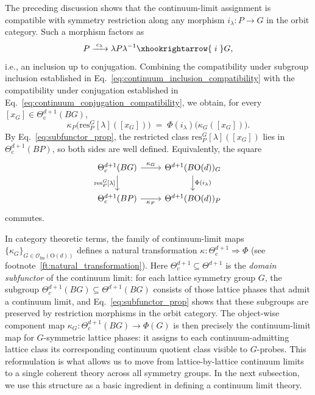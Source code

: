 \documentclass[aps,prx,reprint,superscriptaddress,twocolumn,amsmath,amssymb,amsfonts, nofootinbib]{revtex4-2}
\newcommand{\ofin}{\mathcal{O}_{\text{fin}}}
\newcommand{\res}{\text{res}}
\theoremstyle{apsstyle}
\begin{document}
The preceding discussion shows that the continuum-limit assignment is compatible with symmetry restriction along any morphism $i_\lambda:P\to G$ in the orbit category.
Such a morphism factors as \begin{equation*} P \xrightarrow{\;c_\lambda\;} \lambda P\lambda^{-1} \xhookrightarrow{\;i\;} G,\end{equation*}
i.e., an inclusion up to conjugation. Combining the compatibility under subgroup inclusion established in Eq.~\eqref{eq:continuum_inclusion_compatibility} with the compatibility under conjugation established in Eq.~\eqref{eq:continuum_conjugation_compatibility}, we obtain, for every $[x_G]\in\Theta_{\mathrm c}^{d+1}(BG)$,
\begin{equation*}
  \kappa_P \bigl(\res^{G}_{P}[\lambda ]\left([x_G]\right)\bigr)\;=\;\Phi(i_\lambda )\bigl(\kappa_G\left([x_G]\right)\bigr).
\end{equation*}
By Eq.~\eqref{eq:subfunctor_prop}, the restricted class $\res^G_P[\lambda]([x_G])$ lies in $\Theta_{\mathrm c}^{d+1}(BP)$, so both sides are well defined. Equivalently, the square
\begin{equation}
\begin{tikzcd}
\Theta^{d+1}_{c}(BG) \arrow[r, "\kappa_G"] \arrow[d, "\res^{G}_{P}\text{[}\lambda \text{]}"'] &
\Theta^{d+1}(B\mathrm{O}(d))_{G} \arrow[d, "\Phi(i_\lambda )"]\\
\Theta^{d+1}_{c}(BP) \arrow[r, "\kappa_P"'] &
\Theta^{d+1}(B\mathrm{O}(d))_{P}
\end{tikzcd}
\label{eq:naturality_square}
\end{equation}
commutes. 

In category theoretic terms, the family of continuum-limit maps $\{\kappa_G\}_{G\in\ofin(\mathrm{O}(d))}$ defines a natural transformation $\kappa:\Theta^{d+1}_{\mathrm c}\Rightarrow\Phi$ (see footnote~\ref{ft:natural_transformation}). Here $\Theta^{d+1}_{c}\subseteq \Theta^{d+1}$ is the \emph{domain subfunctor} of the continuum limit: for each lattice symmetry group $G$, the subgroup $\Theta^{d+1}_{c}(BG)\subseteq \Theta^{d+1}(BG)$ consists of those lattice phases that admit a continuum limit, and Eq.~\eqref{eq:subfunctor_prop} shows that these subgroups are preserved by restriction morphisms in the orbit category. The object-wise component map $\kappa_G:\Theta^{d+1}_c(BG)\to \Phi(G)$ is then precisely the continuum-limit map for $G$-symmetric lattice phases: it assigns to each continuum-admitting lattice class its corresponding continuum quotient class visible to $G$-probes. This reformulation is what allows us to move from lattice-by-lattice continuum limits to a single coherent theory across all symmetry groups. In the next subsection, we use this structure as a basic ingredient in defining a continuum limit theory.
\end{document}
